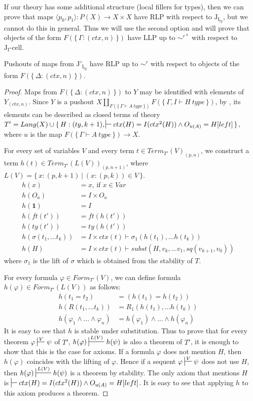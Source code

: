 \documentclass{mscs}
\newcommand{\emptyCtx}{\mathbf{1}}
\newcommand{\I}{\mathrm{I}}
\newcommand{\J}{\mathrm{J}}
\newcommand{\class}[2]{#1\text{-}\mathrm{#2}}
\newcommand{\Icell}[1][\I]{\class{#1}{cell}}
\newcommand{\Jcell}[1][]{\Icell[\J#1]}
\numberwithin{figure}{section}
\begin{document}
If our theory has some additional structure (local fillers for types),
then we can prove that maps $\langle p_0, p_1 \rangle : P(X) \to X \times X$ have RLP with respect to $\J_{\I_{ty}}$,
but we cannot do this in general.
Thus we will use the second option and will prove that objects of the form $F(\{\,\Gamma : (ctx,n)\,\})$ have LLP up to $\sim^{r*}$ with respect to $\Jcell[_\I]$.

\begin{lem}[Jty]
Pushouts of maps from $\J'_{\I_{ty}}$ have RLP up to $\sim^r$ with respect to objects of the form $F(\{\,\Delta : (ctx,n)\,\})$.
\end{lem}
\begin{proof}
Maps from $F(\{\,\Delta : (ctx,n)\,\})$ to $Y$ may be identified with elements of $Y_{(ctx,n)}$.
Since $Y$ is a pushout $X \amalg_{F(\{\,\Gamma \vdash A\ type\,\})} F(\{\,\Gamma, I \vdash H\ type\,\})$,
by , its elements can be described as closed terms of theory
$T' = Lang(X) \cup \{\,H : (ty,k+1), \sststile{}{} ctx(H) = I(ctx^2(H)) \land O_{u(A)} = H[left]\,\}$,
where $u$ is the map $F(\{\,\Gamma \vdash A\ type\,\}) \to X$.

For every set of variables $V$ and every term $t \in Term_{T'}(V)_{(p,n)}$,
we construct a term $h(t) \in Term_{T'}(L(V))_{(p,n+1)}$, where $L(V) = \{\,x : (p,k+1)\ |\ (x : (p,k)) \in V\,\}$.
\begin{align*}
h(x) & = x \text{, if } x \in Var \\
h(O_a) & = I \times O_a \\
h(\emptyCtx) & = I \\
h(ft(t')) & = ft(h(t')) \\
h(ty(t')) & = ty(h(t')) \\
h(\sigma(t_1, \ldots t_k)) & = I \times ctx(t) \vdash \sigma_1(h(t_1), \ldots h(t_k)) \\
h(H) & = I \times ctx(t) \vdash subst(H, v_k, \ldots v_1, sq(v_{k+1}, v_0))
\end{align*}
where $\sigma_1$ is the lift of $\sigma$ which is obtained from the stability of $T$.

For every formula $\varphi \in Form_{T'}(V)$, we can define formula $h(\varphi) \in Form_{T'}(L(V))$ as follows:
\begin{align*}
h(t_1 = t_2) & = (h(t_1) = h(t_2)) \\
h(R(t_1, \ldots t_k)) & = R_1(h(t_1), \ldots h(t_k)) \\
h(\varphi_1 \land \ldots \land \varphi_n) & = h(\varphi_1) \land \ldots \land h(\varphi_n)
\end{align*}
It is easy to see that $h$ is stable under substitution.
Thus to prove that for every theorem $\varphi \sststile{}{V} \psi$ of $T'$, $h(\varphi) \sststile{}{L(V)} h(\psi)$
is also a theorem of $T'$, it is enough to show that this is the case for axioms.
If a formula $\varphi$ does not mention $H$, then $h(\varphi)$ coincides with the lifting of $\varphi$.
Hence if a sequent $\varphi \sststile{}{V} \psi$ does not use $H$, then $h(\varphi) \sststile{}{L(V)} h(\psi)$ is a theorem by stability.
The only axiom that mentions $H$ is $\sststile{}{} ctx(H) = I(ctx^2(H)) \land O_{u(A)} = H[left]$.
It is easy to see that applying $h$ to this axiom produces a theorem.


\end{proof}
\end{document}
